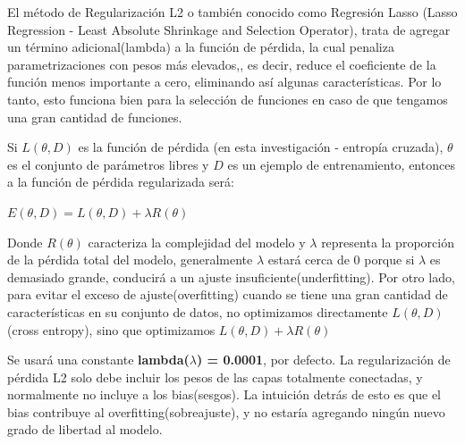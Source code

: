 		

		El método de Regularización L2 o también conocido como Regresión Lasso (Lasso Regression - Least Absolute Shrinkage and Selection Operator), trata de agregar un término adicional(lambda) a la función de pérdida, la cual penaliza parametrizaciones con pesos más elevados,\citep{AulaMLP}, es decir, reduce el coeficiente de la función menos importante a cero, eliminando así algunas características. Por lo tanto, esto funciona bien para la selección de funciones en caso de que tengamos una gran cantidad de funciones.

		Si $L(\theta, D)$ es la función de pérdida (en esta investigación - entropía cruzada), $\theta$ es el conjunto de parámetros libres y $D$ es un ejemplo de entrenamiento, entonces a la función de pérdida regularizada será:

			\begingroup\makeatletter{}\check@mathfonts
			\begin{center}
			$E(\theta,D) =L(\theta,D) +\lambda R(\theta)$
			\end{center}
			\endgroup
		

		Donde $R(\theta)$ caracteriza la complejidad del modelo y $\lambda$ representa la proporción de la pérdida total del modelo, generalmente $\lambda$ estará cerca de 0 porque si $\lambda$ es demasiado grande, conducirá a un ajuste insuficiente(underfitting). Por otro lado, para evitar el exceso de ajuste(overfitting) cuando se tiene una gran cantidad de características en su conjunto de datos, no optimizamos directamente $L(\theta,D)$ (cross entropy), sino que optimizamos $L(\theta,D) +\lambda R(\theta)$

		Se usará una constante {\bf lambda($\lambda$) = 0.0001}, por defecto. La regularización de pérdida L2 solo debe incluir los pesos de las capas totalmente conectadas, y normalmente no incluye a los bias(sesgos). La intuición detrás de esto es que el bias contribuye al overfitting(sobreajuste), y no estaría agregando ningún nuevo grado de libertad al modelo.











	